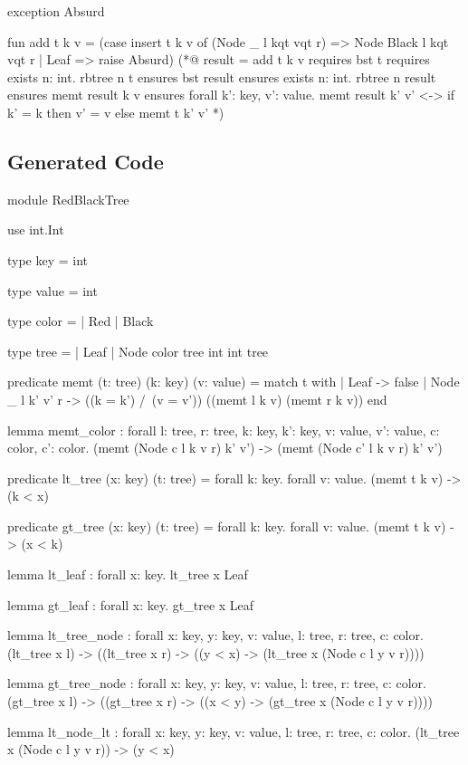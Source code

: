 \begin{cakeml}
exception Absurd

fun add t k v =
  (case insert t k v of
    (Node _ l kqt vqt r) => Node Black l kqt vqt r
  | Leaf => raise Absurd)
(*@ result = add t k v
    requires bst t
    requires exists n: int. rbtree n t
    ensures bst result
    ensures exists n: int. rbtree n result
    ensures memt result k v
    ensures forall k': key, v': value.
    memt result k' v' <-> if k' = k then v' = v else memt t k' v' *)
\end{cakeml}

\subsection{Generated \whyml Code}
\label{subsec:Red_Black_Trees_Whyml}

\begin{whylang}
module RedBlackTree

  use int.Int

  type key = int

  type value = int

  type color =
 | Red
 | Black

  type tree =
 | Leaf
 | Node color tree int int tree

  predicate memt (t: tree) (k: key) (v: value) =
 match t with
 | Leaf -> false
 | Node _ l k' v' r -> ((k = k') /\ (v = v')) \/ ((memt l k v) \/ (memt r k v))
  end

  lemma memt_color : forall l: tree, r: tree, k: key, k': key, v: value, v': value, c: color, c': color. (memt (Node c l k v r) k' v') -> (memt (Node c' l k v r) k' v')

  predicate lt_tree (x: key) (t: tree) =
 forall k: key. forall v: value. (memt t k v) -> (k < x)

  predicate gt_tree (x: key) (t: tree) =
 forall k: key. forall v: value. (memt t k v) -> (x < k)

  lemma lt_leaf : forall x: key. lt_tree x Leaf

  lemma gt_leaf : forall x: key. gt_tree x Leaf

  lemma lt_tree_node : forall x: key, y: key, v: value, l: tree, r: tree, c: color. (lt_tree x l) -> ((lt_tree x r) -> ((y < x) -> (lt_tree x (Node c l y v r))))

  lemma gt_tree_node : forall x: key, y: key, v: value, l: tree, r: tree, c: color. (gt_tree x l) -> ((gt_tree x r) -> ((x < y) -> (gt_tree x (Node c l y v r))))

  lemma lt_node_lt : forall x: key, y: key, v: value, l: tree, r: tree, c: color. (lt_tree x (Node c l y v r)) -> (y < x)


\end{whylang}
